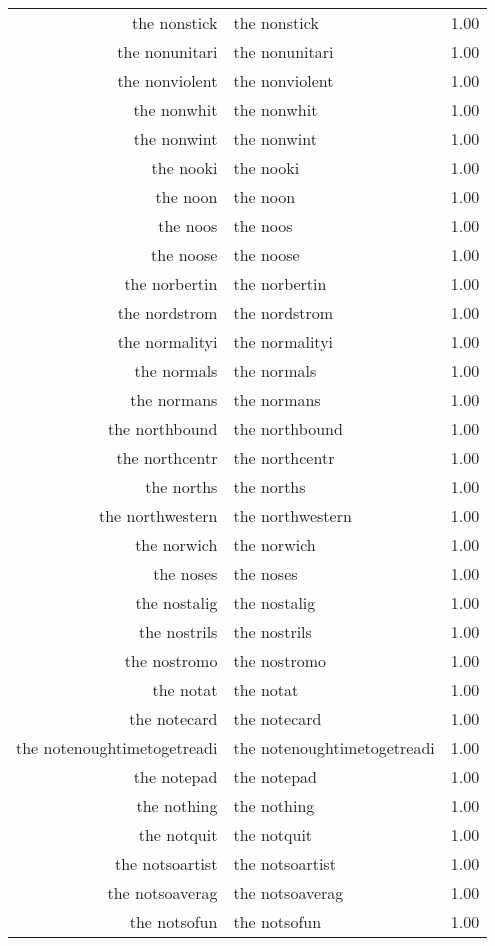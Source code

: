 \begin{table}[ht]
\begin{tabular}{rlr}
  the nonstick & the nonstick & 1.00 \\ 
  the nonunitari & the nonunitari & 1.00 \\ 
  the nonviolent & the nonviolent & 1.00 \\ 
  the nonwhit & the nonwhit & 1.00 \\ 
  the nonwint & the nonwint & 1.00 \\ 
  the nooki & the nooki & 1.00 \\ 
  the noon & the noon & 1.00 \\ 
  the noos & the noos & 1.00 \\ 
  the noose & the noose & 1.00 \\ 
  the norbertin & the norbertin & 1.00 \\ 
  the nordstrom & the nordstrom & 1.00 \\ 
  the normalityi & the normalityi & 1.00 \\ 
  the normals & the normals & 1.00 \\ 
  the normans & the normans & 1.00 \\ 
  the northbound & the northbound & 1.00 \\ 
  the northcentr & the northcentr & 1.00 \\ 
  the norths & the norths & 1.00 \\ 
  the northwestern & the northwestern & 1.00 \\ 
  the norwich & the norwich & 1.00 \\ 
  the noses & the noses & 1.00 \\ 
  the nostalig & the nostalig & 1.00 \\ 
  the nostrils & the nostrils & 1.00 \\ 
  the nostromo & the nostromo & 1.00 \\ 
  the notat & the notat & 1.00 \\ 
  the notecard & the notecard & 1.00 \\ 
  the notenoughtimetogetreadi & the notenoughtimetogetreadi & 1.00 \\ 
  the notepad & the notepad & 1.00 \\ 
  the nothing & the nothing & 1.00 \\ 
  the notquit & the notquit & 1.00 \\ 
  the notsoartist & the notsoartist & 1.00 \\ 
  the notsoaverag & the notsoaverag & 1.00 \\ 
  the notsofun & the notsofun & 1.00 \\ 

\end{tabular}
\end{table}
